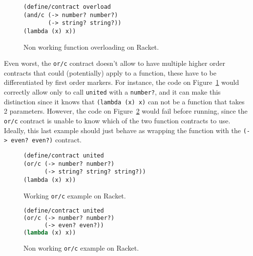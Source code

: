 \documentclass[sigplan,10pt,review,anonymous]{acmart}
\newcommand{\unsure}[2][1=]{}
\newcommand{\racket}[1]{\lstinline[language=racket]{#1}}
\begin{document}
\begin{figure}[h]

\begin{lstlisting}[language=racket]
(define/contract overload
(and/c (-> number? number?)
       (-> string? string?))
(lambda (x) x))
\end{lstlisting}
\caption{Non working function overloading on Racket.}

\end{figure}

Even worst, the \racket{or/c} contract doesn't allow to have multiple higher order
contracts that could (potentially) apply to a function, these have to be
differentiated by first order markers.
For instance, the code on Figure~\ref{code:racket:or/c:working}
would correctly allow only to call
\racket{united} with a \racket{number?},
and it can make this distinction since it knows that
\racket{(lambda (x) x)} can not be a function that takes 2 parameters.
However, the code on Figure~\ref{code:racket:or/c:non-working} would fail
before running, since the \racket{or/c} contract is unable to know
which of the two function contracts to use.
Ideally, this last example should just behave as wrapping
the function with the \racket{(-> even? even?)} contract.

\begin{figure}[h]

\begin{lstlisting}[language=racket]
(define/contract united
(or/c (-> number? number?)
      (-> string? string? string?))
(lambda (x) x))
\end{lstlisting}
\caption{Working \racket{or/c} example on Racket.}
\label{code:racket:or/c:working}

\end{figure}

\begin{figure}[h]

\begin{lstlisting}[language=lisp]
(define/contract united
(or/c (-> number? number?)
      (-> even? even?))
(lambda (x) x))
\end{lstlisting}
\caption{Non working \racket{or/c} example on Racket.}
\label{code:racket:or/c:non-working}

\end{figure}


\unsure{This section is overall a bit hard to follow. I
  think I've figured out what it means, but it needs more love. Also
  give an example which doesn't work and one that does for or/c.}
\end{document}
